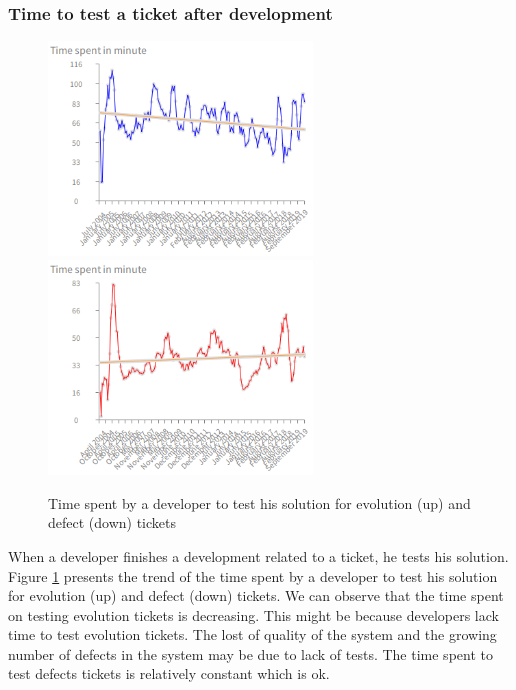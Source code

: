 \documentclass[10pt,conference]{IEEEtran}
\begin{document}
\subsubsection{Time  to test a ticket after development}


 \begin{figure}[htbp]
  \centering
  \includegraphics[width=70mm]{./images/evolutionTest.png} \\
  \includegraphics[width=70mm]{./images/timeDevTest.png}
  \caption{Time spent by a developer to test his solution for  evolution (up) and defect (down) tickets}
  \label{fig:devTimeTest}
\end{figure}
When a developer finishes a development related to a ticket, he tests his solution.  
Figure \ref{fig:devTimeTest} presents the trend of the time spent by a developer to test his solution for evolution (up) and defect (down) tickets.
We can observe that the time spent on testing evolution tickets is decreasing. 
This might be because developers lack time to  test evolution tickets. 
The lost of quality of the system and the growing number of defects in the system may be due to lack of tests.
The time spent to test defects tickets is relatively constant which is ok.
 
\end{document}
